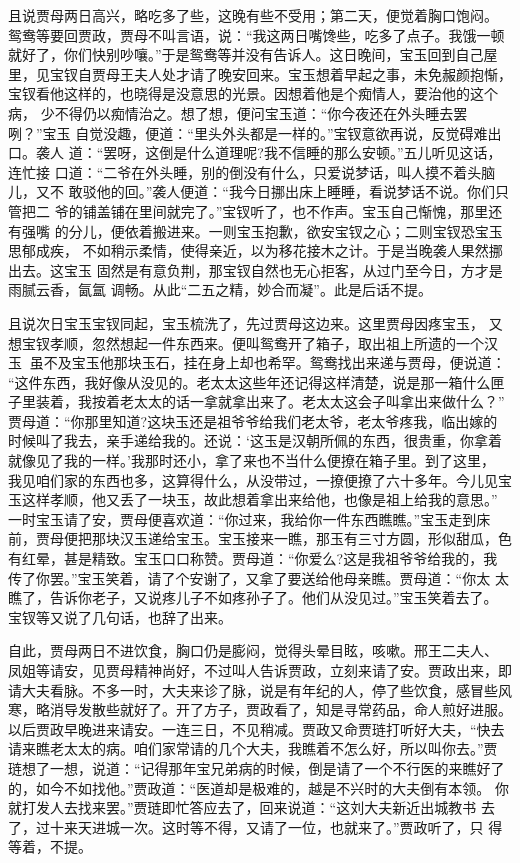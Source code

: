且说贾母两日高兴，略吃多了些，这晚有些不受用；第二天，便觉着胸口饱闷。
鸳鸯等要回贾政，贾母不叫言语，说：“我这两日嘴馋些，吃多了点子。我饿一顿
就好了，你们快别吵嚷。”于是鸳鸯等并没有告诉人。这日晚间，宝玉回到自己屋
里，见宝钗自贾母王夫人处才请了晚安回来。宝玉想着早起之事，未免赧颜抱惭，
宝钗看他这样的，也晓得是没意思的光景。因想着他是个痴情人，要治他的这个病，
少不得仍以痴情治之。想了想，便问宝玉道：“你今夜还在外头睡去罢咧？”宝玉
自觉没趣，便道：“里头外头都是一样的。”宝钗意欲再说，反觉碍难出口。袭人
道：“罢呀，这倒是什么道理呢?我不信睡的那么安顿。”五儿听见这话，连忙接
口道：“二爷在外头睡，别的倒没有什么，只爱说梦话，叫人摸不着头脑儿，又不
敢驳他的回。”袭人便道：“我今日挪出床上睡睡，看说梦话不说。你们只管把二
爷的铺盖铺在里间就完了。”宝钗听了，也不作声。宝玉自己惭愧，那里还有强嘴
的分儿，便依着搬进来。一则宝玉抱歉，欲安宝钗之心；二则宝钗恐宝玉思郁成疾，
不如稍示柔情，使得亲近，以为移花接木之计。于是当晚袭人果然挪出去。这宝玉
固然是有意负荆，那宝钗自然也无心拒客，从过门至今日，方才是雨腻云香，氤氲
调畅。从此“二五之精，妙合而凝”。此是后话不提。

且说次日宝玉宝钗同起，宝玉梳洗了，先过贾母这边来。这里贾母因疼宝玉，
又想宝钗孝顺，忽然想起一件东西来。便叫鸳鸯开了箱子，取出祖上所遗的一个汉
玉，虽不及宝玉他那块玉石，挂在身上却也希罕。鸳鸯找出来递与贾母，便说道：
“这件东西，我好像从没见的。老太太这些年还记得这样清楚，说是那一箱什么匣
子里装着，我按着老太太的话一拿就拿出来了。老太太这会子叫拿出来做什么？”
贾母道：“你那里知道?这块玉还是祖爷爷给我们老太爷，老太爷疼我，临出嫁的
时候叫了我去，亲手递给我的。还说：‘这玉是汉朝所佩的东西，很贵重，你拿着
就像见了我的一样。’我那时还小，拿了来也不当什么便撩在箱子里。到了这里，
我见咱们家的东西也多，这算得什么，从没带过，一撩便撩了六十多年。今儿见宝
玉这样孝顺，他又丢了一块玉，故此想着拿出来给他，也像是祖上给我的意思。”
一时宝玉请了安，贾母便喜欢道：“你过来，我给你一件东西瞧瞧。”宝玉走到床
前，贾母便把那块汉玉递给宝玉。宝玉接来一瞧，那玉有三寸方圆，形似甜瓜，色
有红晕，甚是精致。宝玉口口称赞。贾母道：“你爱么?这是我祖爷爷给我的，我
传了你罢。”宝玉笑着，请了个安谢了，又拿了要送给他母亲瞧。贾母道：“你太
太瞧了，告诉你老子，又说疼儿子不如疼孙子了。他们从没见过。”宝玉笑着去了。
宝钗等又说了几句话，也辞了出来。

自此，贾母两日不进饮食，胸口仍是膨闷，觉得头晕目眩，咳嗽。邢王二夫人、
凤姐等请安，见贾母精神尚好，不过叫人告诉贾政，立刻来请了安。贾政出来，即
请大夫看脉。不多一时，大夫来诊了脉，说是有年纪的人，停了些饮食，感冒些风
寒，略消导发散些就好了。开了方子，贾政看了，知是寻常药品，命人煎好进服。
以后贾政早晚进来请安。一连三日，不见稍减。贾政又命贾琏打听好大夫，“快去
请来瞧老太太的病。咱们家常请的几个大夫，我瞧着不怎么好，所以叫你去。”贾
琏想了一想，说道：“记得那年宝兄弟病的时候，倒是请了一个不行医的来瞧好了
的，如今不如找他。”贾政道：“医道却是极难的，越是不兴时的大夫倒有本领。
你就打发人去找来罢。”贾琏即忙答应去了，回来说道：“这刘大夫新近出城教书
去了，过十来天进城一次。这时等不得，又请了一位，也就来了。”贾政听了，只
得等着，不提。

